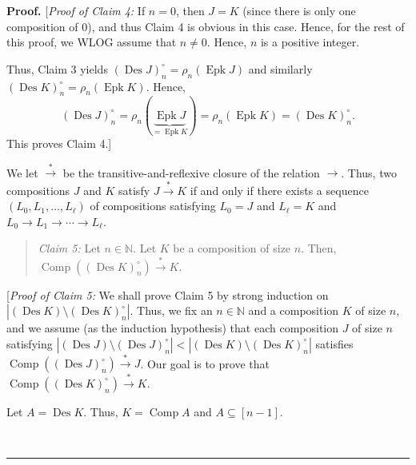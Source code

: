 \documentclass[numbers=enddot,12pt,final,onecolumn,notitlepage]{scrartcl}%
\theoremstyle{definition}
\newenvironment{statement}{\begin{quote}}{\end{quote}}
\newenvironment{proof}[1][Proof]{\noindent\textbf{#1.} }{\ \rule{0.5em}{0.5em}}
\newenvironment{verlong}{}{}
\begin{document}
\begin{verlong}
\begin{proof}
[\textit{Proof of Claim 4:} If $n=0$, then $J=K$ (since there is only
one composition of $0$), and thus Claim 4 is obvious in this case.
Hence, for the rest of this proof, we WLOG assume that $n\neq0$.
Hence, $n$ is a positive integer.

Thus, Claim 3 yields $\left(  \operatorname{Des}%
J\right)  _{n}^{\circ}=\rho_{n}\left(  \operatorname{Epk}J\right)  $ and
similarly $\left(  \operatorname{Des}K\right)  _{n}^{\circ}=\rho_{n}\left(
\operatorname{Epk}K\right)  $. Hence,%
\[
\left(  \operatorname{Des}J\right)  _{n}^{\circ}=\rho_{n}\left(
\underbrace{\operatorname{Epk}J}_{=\operatorname{Epk}K}\right)  =\rho
_{n}\left(  \operatorname{Epk}K\right)  =\left(  \operatorname{Des}K\right)
_{n}^{\circ}.
\]
This proves Claim 4.]

We let $\overset{\ast}{\rightarrow}$ be the transitive-and-reflexive closure
of the relation $\rightarrow$. Thus, two compositions $J$ and $K$ satisfy
$J\overset{\ast}{\rightarrow}K$ if and only if there exists a sequence
$\left(  L_{0},L_{1},\ldots,L_{\ell}\right)  $ of compositions satisfying
$L_{0}=J$ and $L_{\ell}=K$ and $L_{0}\rightarrow L_{1}\rightarrow
\cdots\rightarrow L_{\ell}$.

\begin{statement}
\textit{Claim 5:} Let $n\in\mathbb{N}$. Let $K$ be a composition of size $n$.
Then, $\operatorname*{Comp}\left(  \left(  \operatorname{Des}K\right)
_{n}^{\circ}\right)  \overset{\ast}{\rightarrow}K$.
\end{statement}

[\textit{Proof of Claim 5:} We shall prove Claim 5 by strong induction on
$\left\vert \left(  \operatorname{Des}K\right)  \setminus\left(
\operatorname{Des}K\right)  _{n}^{\circ}\right\vert $. Thus, we fix an
$n\in\mathbb{N}$ and a composition $K$ of size $n$, and we assume (as the
induction hypothesis) that each composition $J$ of size $n$ satisfying
$\left\vert \left(  \operatorname{Des}J\right)  \setminus\left(
\operatorname{Des}J\right)  _{n}^{\circ}\right\vert <\left\vert \left(
\operatorname{Des}K\right)  \setminus\left(  \operatorname{Des}K\right)
_{n}^{\circ}\right\vert $ satisfies $\operatorname*{Comp}\left(  \left(
\operatorname{Des}J\right)  _{n}^{\circ}\right)  \overset{\ast}{\rightarrow
}J$. Our goal is to prove that $\operatorname*{Comp}\left(  \left(
\operatorname{Des}K\right)  _{n}^{\circ}\right)  \overset{\ast}{\rightarrow
}K$.

Let $A=\operatorname{Des}K$. Thus, $K=\operatorname*{Comp}A$ and
$A\subseteq\left[  n-1\right]  $.


\end{proof}
\end{verlong}
\end{document}
